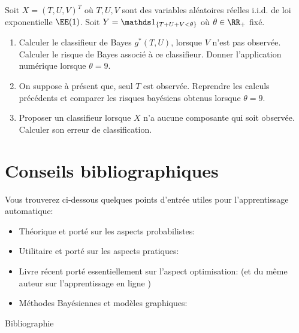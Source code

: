 \documentclass[a4paper,11pt]{article}
\begin{document}
\bigskip
%

\bigskip

\exercice Soit $X = (T, U, V)^T$ où $T, U, V$ sont des variables aléatoires réelles i.i.d. de loi exponentielle $\EE(1)$.
Soit $Y=\ind_{\{T+U+V<\theta\}}$ où $\theta\in\RR_+$ fixé.

\begin{enumerate}
\item Calculer le classifieur de Bayes $g^*(T,U)$, lorsque $V$ n'est pas observée.
 Calculer le risque de Bayes associé à ce classifieur. Donner l'application numérique lorsque $\theta = 9$.

\item On suppose à présent que, seul $T$ est observée. Reprendre les calculs précédents et comparer les risques bayésiens obtenus lorsque  $\theta = 9$.

\item Proposer un classifieur lorsque $X$ n'a aucune composante qui soit observée. Calculer son erreur de classification.
\end{enumerate}


\section*{Conseils bibliographiques}
\label{sec:bibliographie}


Vous trouverez ci-dessous quelques points d’entrée utiles pour l'apprentissage automatique:

\begin{itemize}
	\item Théorique et porté sur les aspects probabilistes: \cite{Devroye_Gyorfi_Lugosi96}
	\item Utilitaire et porté sur les aspects pratiques: \cite{Hastie_Tibshirani_Friedman09}
	\item Livre récent porté essentiellement sur l’aspect optimisation: \cite{Shalev-Shwartz_Ben-David14} (et du même auteur sur l'apprentissage en ligne \cite{Shalev-Shwartz11})
	\item Méthodes Bayésiennes et modèles graphiques: \cite{Murphy12}
\end{itemize}



\begin{frame}{Bibliographie}
\printbibliography
\end{frame}
\end{document}
